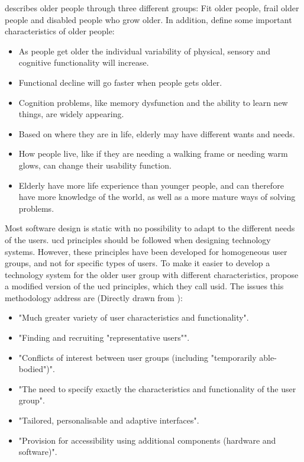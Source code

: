 \cite{gregor} describes older people through three different groups: Fit older people, frail older people and disabled people who grow older. In addition, \cite{gregor} define some important characteristics of older people:
\begin{itemize}
\item As people get older the individual variability of physical, sensory and cognitive functionality will increase. 
\item Functional decline will go faster when people gets older. 
\item Cognition problems, like memory dysfunction and the ability to learn new things, are widely appearing.
\item Based on where they are in life, elderly may have different wants and needs. 
\item How people live, like if they are needing a walking frame or needing warm glows, can change their usability function.
\item Elderly have more life experience than younger people, and can therefore have more knowledge of the world, as well as a more mature ways of solving problems. 
\end{itemize}

Most software design is static with no possibility to adapt to the different needs of the users. \ac{ucd} principles should be followed when designing technology systems. However, these principles have been developed for homogeneous user groups, and not for specific types of users. To make it easier to develop a technology system for the older user group with different characteristics, \cite{gregor} propose a modified version of the \ac{ucd} principles, which they call \ac{usid}. The issues this methodology address are (Directly drawn from \cite{gregor}): 
\begin{itemize}
\item "Much greater variety of user characteristics and functionality". 
\item "Finding and recruiting "representative users"". 
\item "Conflicts of interest between user groups (including "temporarily able-bodied")".
\item "The need to specify exactly the characteristics and functionality of the user group".
\item "Tailored, personalisable and adaptive interfaces".
\item "Provision for accessibility using additional components (hardware and software)".
\end{itemize}


